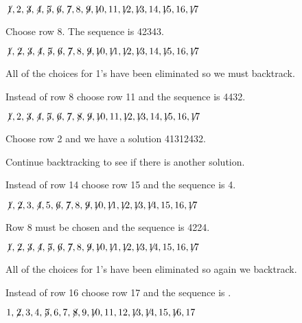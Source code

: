 $\not\! 1,2,\not\! 3,\not\! 4,\not\! 5,\not\! 6,\not\! 7,8,\not\! 9,\not\!\! 10,11,\not\!\! 12,\not\!\! 13,14, \not\!\! 15,16,\not\!\! 17$

\noindent Choose row 8. The sequence is 4{}2{}34{}3\textvisiblespace.

$\not\! 1,\not\! 2,\not\! 3,\not\! 4,\not\! 5,\not\! 6,\not\! 7,8,\not\! 9,\not\!\! 10,\not\!\! 11,\not\!\! 12,\not\!\! 13,14, \not\!\! 15,16,\not\!\! 17$

\noindent All of the choices for 1's have been eliminated so we must backtrack.

\smallskip

\noindent Instead of row 8 choose row 11 and the sequence is 44{}3{}2.


$\not\! 1,2,\not\! 3,\not\! 4,\not\! 5,\not\! 6,\not\! 7,\not\! 8,\not\! 9,\not\!\! 10,11,\not\!\! 12,\not\!\! 13,14, \not\!\! 15,16,\not\!\! 17$

\noindent Choose row 2 and we have a solution 4{}1{}3{}1{}2{}4{}3{}2.

\smallskip

\noindent Continue backtracking to see if there is another solution.

\smallskip

\noindent Instead of row 14 choose row 15 and the sequence is 4\textvisiblespace {}.

$\not\! 1,\not\! 2,3,\not\! 4,5,\not\! 6,\not\! 7,8,\not\! 9,\not\!\! 10,\not\!\! 11,\not\!\! 12,\not\!\! 13,\not\!\! 14,15,16,\not\!\! 17$

\newpage

\noindent Row 8 must be chosen and the sequence is 4{}22{}4.

$\not\! 1,\not\! 2,\not\! 3,\not\! 4,\not\! 5,\not\! 6,\not\! 7,8,\not\! 9,\not\!\! 10,\not\!\! 11,\not\!\! 12,\not\!\! 13,\not\!\! 14,15,16,\not\!\! 17$

\noindent All of the choices for 1's have been eliminated so again we backtrack.

\smallskip

\noindent Instead of row 16 choose row 17 and the sequence is \textvisiblespace \textvisiblespace \textvisiblespace{}\textvisiblespace.

$1,\not\! 2,3,4,\not\! 5,6,7,\not\! 8,9,\not\!\! 10,11,12,\not\!\! 13,\not\!\! 14,15,\not\!\! 16,17$


